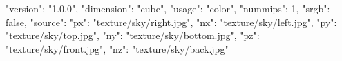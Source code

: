 {
  "version": "1.0.0",
  "dimension": "cube",
  "usage": "color",
  "nummips": 1,
  "srgb": false,
  "source": {
    "px": "texture/sky/right.jpg",
    "nx": "texture/sky/left.jpg",
    "py": "texture/sky/top.jpg",
    "ny": "texture/sky/bottom.jpg",
    "pz": "texture/sky/front.jpg",
    "nz": "texture/sky/back.jpg"
  }
}